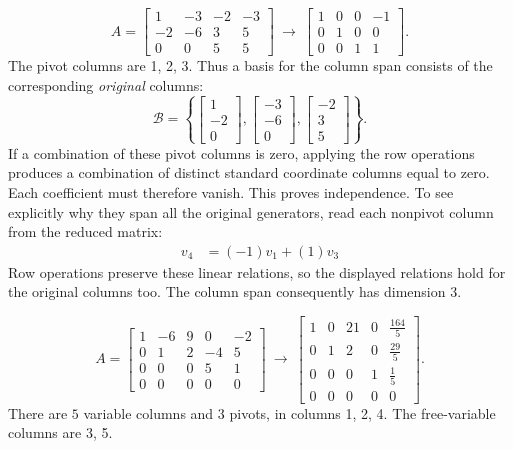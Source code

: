 \[A=\left[\begin{array}{rrrr}1&-3&-2&-3\\-2&-6&3&5\\0&0&5&5\end{array}\right]\ \longrightarrow\ \left[\begin{array}{rrrr}1&0&0&-1\\0&1&0&0\\0&0&1&1\end{array}\right].\]
The pivot columns are 1, 2, 3. Thus a basis for the column span consists of the corresponding \emph{original} columns:
\[\mathcal B=\left\{\left[\begin{array}{r}1\\-2\\0\end{array}\right],\left[\begin{array}{r}-3\\-6\\0\end{array}\right],\left[\begin{array}{r}-2\\3\\5\end{array}\right]\right\}.\]
If a combination of these pivot columns is zero, applying the row operations produces a combination of distinct standard coordinate columns equal to zero. Each coefficient must therefore vanish. This proves independence. To see explicitly why they span all the original generators, read each nonpivot column from the reduced matrix:
\[\begin{aligned}v_{4}&=(-1)v_{1}+(1)v_{3}\end{aligned}\]
Row operations preserve these linear relations, so the displayed relations hold for the original columns too. The column span consequently has dimension $3$.

\[A=\left[\begin{array}{rrrrr}1&-6&9&0&-2\\0&1&2&-4&5\\0&0&0&5&1\\0&0&0&0&0\end{array}\right]\ \longrightarrow\ \left[\begin{array}{rrrrr}1&0&21&0&\frac{164}{5}\\0&1&2&0&\frac{29}{5}\\0&0&0&1&\frac{1}{5}\\0&0&0&0&0\end{array}\right].\]
There are $5$ variable columns and $3$ pivots, in columns 1, 2, 4. The free-variable columns are 3, 5.

